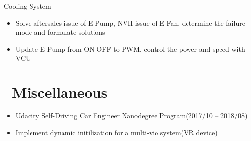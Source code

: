 \documentclass{resume}
\begin{document}
Cooling System
\begin{itemize}
  \item Solve aftersales issue of E-Pump, NVH issue of E-Fan, determine the failure mode and formulate solutions
  \item Update E-Pump from ON-OFF to PWM, control the power and speed with VCU
\end{itemize}


\section{\faCode\ Miscellaneous}
\begin{itemize}[parsep=0.5ex]
  \item Udacity Self-Driving Car Engineer Nanodegree Program(2017/10 -- 2018/08)
  \item Implement dynamic initilization for a multi-vio system(VR device)
\end{itemize}

%
%
\end{document}
